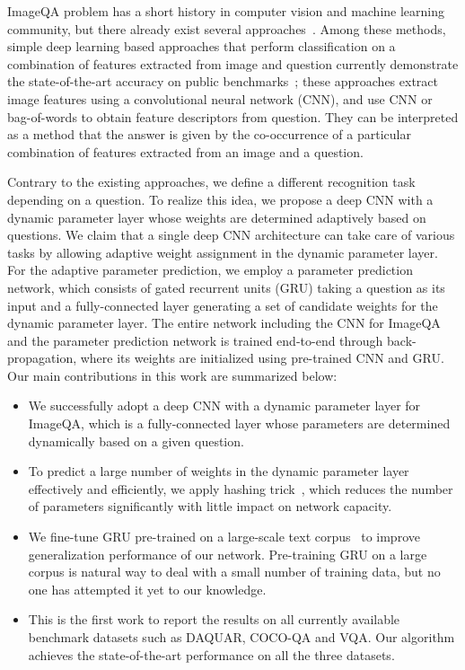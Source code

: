\documentclass[10pt,twocolumn,letterpaper]{article}
\begin{document}
ImageQA problem has a short history in computer vision and machine learning community, but there already exist several approaches~\cite{Baiduqa, Convqa, Multiworld, Askneurons, mren2015}.
Among these methods, simple deep learning based approaches that perform classification on a combination of features extracted from image and question currently demonstrate the state-of-the-art accuracy on public benchmarks~\cite{mren2015, Convqa}; these approaches extract image features using a convolutional neural network (CNN), and use CNN or bag-of-words to obtain feature descriptors from question.
They can be interpreted as a method that the answer is given by the co-occurrence of a particular combination of features extracted from an image and a question.



Contrary to the existing approaches, we define a different recognition task depending on a question.
To realize this idea, we propose a deep CNN with a dynamic parameter layer whose weights are determined adaptively based on questions.
We claim that a single deep CNN architecture can take care of various tasks by allowing adaptive  weight assignment in the dynamic parameter layer.
For the adaptive parameter prediction, we employ a parameter prediction network, which consists of gated recurrent units (GRU) taking a question as its input and a fully-connected layer generating a set of candidate weights for the dynamic parameter layer.
The entire network including the CNN for ImageQA and the parameter prediction network is trained end-to-end through back-propagation, where its weights are initialized using pre-trained CNN and GRU.
Our main contributions in this work are summarized below:
\begin{itemize}
\item We successfully adopt a deep CNN with a dynamic parameter layer for ImageQA, which is a fully-connected layer whose parameters are determined dynamically based on a given question.
\item To predict a large number of weights in the dynamic parameter layer effectively and efficiently, we apply hashing trick~\cite{Hashing}, which reduces the number of parameters significantly with little impact on network capacity.
\item We fine-tune GRU pre-trained on a large-scale text corpus~\cite{Skipthought} to improve generalization performance of our network. Pre-training GRU on a large corpus is natural way to deal with a small number of training data, but no one has attempted it yet to our knowledge.
\item This is the first work to report the results on all currently available benchmark datasets such as DAQUAR, COCO-QA and VQA. 
Our algorithm achieves the state-of-the-art performance on all the three datasets.
\end{itemize}
\end{document}
